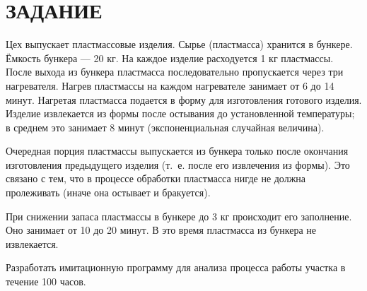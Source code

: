 \section*{ЗАДАНИЕ}

Цех выпускает пластмассовые изделия.
Сырье (пластмасса) хранится в бункере.
Ёмкость бункера --- 20 кг. На каждое изделие расходуется 1 кг пластмассы.
После выхода из бункера пластмасса последовательно пропускается 
через три нагревателя.
Нагрев пластмассы на каждом нагревателе занимает от 6 до 14 минут.
Нагретая пластмасса подается в форму для изготовления готового изделия.
Изделие извлекается из формы после остывания до установленной температуры;
в среднем это занимает 8 минут (экспоненциальная случайная величина).

Очередная порция пластмассы выпускается из бункера только после
окончания изготовления предыдущего изделия (т.~е. после его извлечения из формы).
Это связано с тем, что в процессе обработки пластмасса нигде не должна
пролеживать (иначе она остывает и бракуется).

При снижении запаса пластмассы в бункере до 3 кг происходит его заполнение.
Оно занимает от 10 до 20 минут.
В это время пластмасса из бункера не извлекается.

Разработать имитационную программу для анализа процесса работы
участка в течение 100 часов.